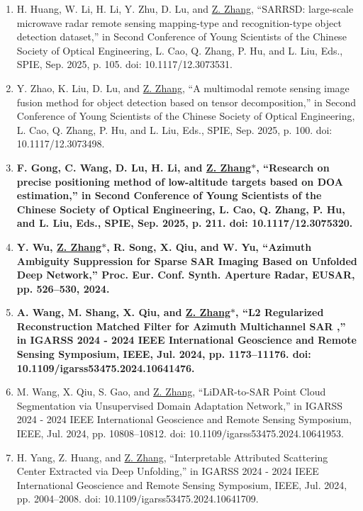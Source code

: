 \documentclass[paper=a4,fontsize=11pt]{scrartcl}
\begin{document}
\begin{enumerate}

\item H. Huang, W. Li, H. Li, Y. Zhu, D. Lu, and \underline{Z. Zhang}, ``SARRSD: large-scale microwave radar remote sensing mapping-type and recognition-type object detection dataset,'' in Second Conference of Young Scientists of the Chinese Society of Optical Engineering, L. Cao, Q. Zhang, P. Hu, and L. Liu, Eds., SPIE, Sep. 2025, p. 105. doi: 10.1117/12.3073531.

\item Y. Zhao, K. Liu, D. Lu, and \underline{Z. Zhang}, ``A multimodal remote sensing image fusion method for object detection based on tensor decomposition,” in Second Conference of Young Scientists of the Chinese Society of Optical Engineering, L. Cao, Q. Zhang, P. Hu, and L. Liu, Eds., SPIE, Sep. 2025, p. 100. doi: 10.1117/12.3073498.

\item \textbf{F. Gong, C. Wang, D. Lu, H. Li, and \underline{Z. Zhang$\ast$}, ``Research on precise positioning method of low-altitude targets based on DOA estimation,'' in Second Conference of Young Scientists of the Chinese Society of Optical Engineering, L. Cao, Q. Zhang, P. Hu, and L. Liu, Eds., SPIE, Sep. 2025, p. 211. doi: 10.1117/12.3075320.}
	
\item \textbf{Y. Wu, \underline{Z. Zhang$\ast$}, R. Song, X. Qiu, and W. Yu, ``Azimuth Ambiguity Suppression for Sparse SAR Imaging Based on Unfolded Deep Network,'' Proc. Eur. Conf. Synth. Aperture Radar, EUSAR, pp. 526–530, 2024.}

\item \textbf{A. Wang, M. Shang, X. Qiu, and \underline{Z. Zhang$\ast$}, ``L2 Regularized Reconstruction Matched Filter for Azimuth Multichannel SAR ,'' in IGARSS 2024 - 2024 IEEE International Geoscience and Remote Sensing Symposium, IEEE, Jul. 2024, pp. 1173–11176. doi: 10.1109/igarss53475.2024.10641476.}

\item M. Wang, X. Qiu, S. Gao, and \underline{Z. Zhang}, ``LiDAR-to-SAR Point Cloud Segmentation via Unsupervised Domain Adaptation Network,'' in IGARSS 2024 - 2024 IEEE International Geoscience and Remote Sensing Symposium, IEEE, Jul. 2024, pp. 10808–10812. doi: 10.1109/igarss53475.2024.10641953.

\item H. Yang, Z. Huang, and \underline{Z. Zhang}, ``Interpretable Attributed Scattering Center Extracted via Deep Unfolding,'' in IGARSS 2024 - 2024 IEEE International Geoscience and Remote Sensing Symposium, IEEE, Jul. 2024, pp. 2004–2008. doi: 10.1109/igarss53475.2024.10641709.
	

\end{enumerate}
\end{document}
